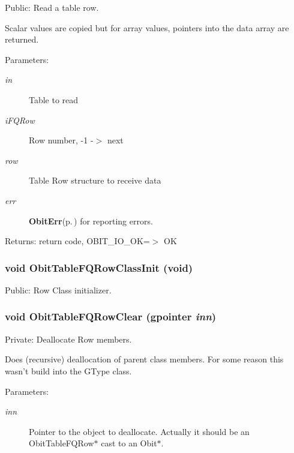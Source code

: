 Public: Read a table row. 

Scalar values are copied but for array values, pointers into the data array are returned. \begin{Desc}
\item[Parameters:]
\begin{description}
\item[{\em in}]Table to read \item[{\em i\-FQRow}]Row number, -1 -$>$ next \item[{\em row}]Table Row structure to receive data \item[{\em err}]{\bf Obit\-Err}{\rm (p.\,\pageref{structObitErr})} for reporting errors. \end{description}
\end{Desc}
\begin{Desc}
\item[Returns:]return code, OBIT\_\-IO\_\-OK=$>$ OK \end{Desc}
\subsubsection{\setlength{\rightskip}{0pt plus 5cm}void Obit\-Table\-FQRow\-Class\-Init (void)}\label{ObitTableFQ_8c_a26}


Public: Row Class initializer. 

\subsubsection{\setlength{\rightskip}{0pt plus 5cm}void Obit\-Table\-FQRow\-Clear (gpointer {\em inn})}\label{ObitTableFQ_8c_a7}


Private: Deallocate Row members. 

Does (recursive) deallocation of parent class members. For some reason this wasn't build into the GType class. \begin{Desc}
\item[Parameters:]
\begin{description}
\item[{\em inn}]Pointer to the object to deallocate. Actually it should be an Obit\-Table\-FQRow$\ast$ cast to an Obit$\ast$. \end{description}
\end{Desc}
